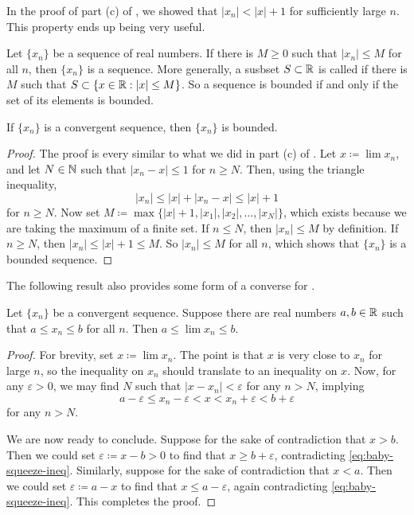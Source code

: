 \documentclass[../notes.tex]{subfiles}
\begin{document}
In the proof of part (c) of , we showed that $|x_n| < |x|+1$ for sufficiently large $n$. This property ends up being very useful.

\begin{definition}
    Let $\{x_n\}$ be a sequence of real numbers. If there is $M\geq 0$ such that $|x_n|\leq M$ for all $n$, then $\{x_n\}$ is a  sequence. More generally, a susbset $S\subset \mathbb R$ is called  if there is $M$ such that $S\subset \{x\in \mathbb R : |x|\leq M\}$. So a sequence is bounded if and only if the set of its elements is bounded. 
\end{definition}

\begin{proposition} \label{prop:conv-impy-bded}
    If $\{x_n\}$ is a convergent sequence, then $\{x_n\}$ is bounded.
\end{proposition}
\begin{proof}
    The proof is every similar to what we did in part (c) of . Let $x\coloneqq\lim x_n$, and let $N\in \mathbb N$ such that $|x_n-x|\leq 1$ for $n\geq N$. Then, using the triangle inequality,
    \[|x_n| \leq |x| + |x_n-x| \leq |x|+1\]
    for $n\geq N$. Now set $M\coloneqq\max\{|x|+1, |x_1|, |x_2|, \dots, |x_N|\}$, which exists because we are taking the maximum of a finite set. If $n\leq N$, then $|x_n|\leq M$ by definition. If $n\geq N$, then $|x_n|\leq |x|+1 \leq M$. So $|x_n|\leq M$ for all $n$, which shows that $\{x_n\}$ is a bounded sequence.  
\end{proof}
The following result also provides some form of a converse for .
\begin{proposition} \label{prop:bound-seq-is-bound-limit}
    Let $\{x_n\}$ be a convergent sequence. Suppose there are real numbers $a,b\in\mathbb R$ such that $a\le x_n\le b$ for all $n$. Then $a\le\lim x_n\le b$.
\end{proposition}
\begin{proof}
    For brevity, set $x\coloneqq\lim x_n$. The point is that $x$ is very close to $x_n$ for large $n$, so the inequality on $x_n$ should translate to an inequality on $x$. Now, for any $\varepsilon>0$, we may find $N$ such that $\left|x-x_n\right|<\varepsilon$ for any $n>N$, implying
    \begin{equation}
        a-\varepsilon\le x_n-\varepsilon<x<x_n+\varepsilon<b+\varepsilon \label{eq:baby-squeeze-ineq}
    \end{equation}
    for any $n>N$.

    We are now ready to conclude. Suppose for the sake of contradiction that $x>b$. Then we could set $\varepsilon\coloneqq x-b>0$ to find that $x\ge b+\varepsilon$, contradicting \eqref{eq:baby-squeeze-ineq}. Similarly, suppose for the sake of contradiction that $x<a$. Then we could set $\varepsilon\coloneqq a-x$ to find that $x\le a-\varepsilon$, again contradicting \eqref{eq:baby-squeeze-ineq}. This completes the proof.
\end{proof}
\end{document}
